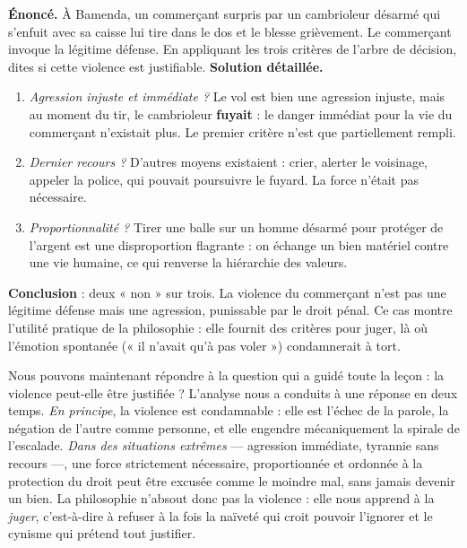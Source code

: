 \documentclass[11pt]{article}
\newcounter{popsec}
\newcounter{popsub}
\newcommand{\courssub}[1]{%
  \stepcounter{popsub}%
  \par\vspace{9pt}\noindent{\popxbold\fontsize{11.5}{13}\selectfont\color{popink}{\color{poporange}\thepopsec.\thepopsub}\hspace{6pt}#1}\par\nopagebreak\vspace{4pt}
}
\begin{document}
\begin{exoresolu}
\textbf{Énoncé.} À Bamenda, un commerçant surpris par un cambrioleur désarmé qui s'enfuit avec sa caisse lui tire dans le dos et le blesse grièvement. Le commerçant invoque la légitime défense. En appliquant les trois critères de l'arbre de décision, dites si cette violence est justifiable.
\tcblower
\textbf{Solution détaillée.}
\begin{enumerate}
\item \emph{Agression injuste et immédiate ?} Le vol est bien une agression injuste, mais au moment du tir, le cambrioleur \textbf{fuyait} : le danger immédiat pour la vie du commerçant n'existait plus. Le premier critère n'est que partiellement rempli.
\item \emph{Dernier recours ?} D'autres moyens existaient : crier, alerter le voisinage, appeler la police, qui pouvait poursuivre le fuyard. La force n'était pas nécessaire.
\item \emph{Proportionnalité ?} Tirer une balle sur un homme désarmé pour protéger de l'argent est une disproportion flagrante : on échange un bien matériel contre une vie humaine, ce qui renverse la hiérarchie des valeurs.
\end{enumerate}
\textbf{Conclusion} : deux « non » sur trois. La violence du commerçant n'est pas une légitime défense mais une agression, punissable par le droit pénal. Ce cas montre l'utilité pratique de la philosophie : elle fournit des critères pour juger, là où l'émotion spontanée (« il n'avait qu'à pas voler ») condamnerait à tort.
\end{exoresolu}

\courssub{Conclusion de la leçon}

Nous pouvons maintenant répondre à la question qui a guidé toute la leçon : la violence peut-elle être justifiée ? L'analyse nous a conduits à une réponse en deux temps. \emph{En principe}, la violence est condamnable : elle est l'échec de la parole, la négation de l'autre comme personne, et elle engendre mécaniquement la spirale de l'escalade. \emph{Dans des situations extrêmes} — agression immédiate, tyrannie sans recours —, une force strictement nécessaire, proportionnée et ordonnée à la protection du droit peut être excusée comme le moindre mal, sans jamais devenir un bien. La philosophie n'absout donc pas la violence : elle nous apprend à la \emph{juger}, c'est-à-dire à refuser à la fois la naïveté qui croit pouvoir l'ignorer et le cynisme qui prétend tout justifier.
\end{document}
